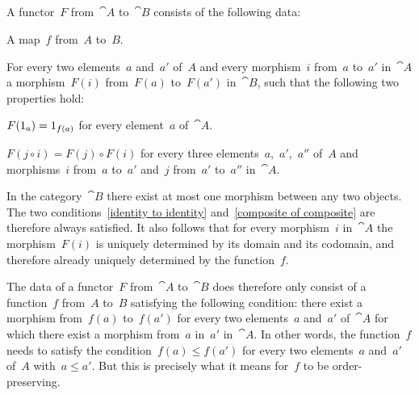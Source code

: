 \subsection{}

A functor~$F$ from~$\cat{A}$ to~$\cat{B}$ consists of the following data:
\begin{itemize*}
	\item
		A map~$f$ from~$A$ to~$B$.
	\item
		For every two elements~$a$ and~$a'$ of~$A$ and every morphism~$i$ from~$a$ to~$a'$ in~$\cat{A}$ a morphism~$F(i)$ from~$F(a)$ to~$F(a')$ in~$\cat{B}$, such that the following two properties hold:
		\begin{enumerate*}
			\item
				\label{identity to identity}
				$F(1_a) = 1_{f(a)}$ for every element~$a$ of~$\cat{A}$.
			\item
				\label{composite of composite}
				$F(j ∘ i) = F(j) ∘ F(i)$ for every three elements~$a$,~$a'$,~$a''$ of~$A$ and morphisms~$i$ from~$a$ to~$a'$ and~$j$ from~$a'$ to~$a''$ in~$\cat{A}$.
		\end{enumerate*}
\end{itemize*}

In the category~$\cat{B}$ there exist at most one morphism between any two objects.
The two conditions~\ref{identity to identity} and~\ref{composite of composite} are therefore always satisfied.
It also follows that for every morphism~$i$ in~$\cat{A}$ the morphism~$F(i)$ is uniquely determined by its domain and its codomain, and therefore already uniquely determined by the function~$f$.

The data of a functor~$F$ from~$\cat{A}$ to~$\cat{B}$ does therefore only consist of a function~$f$ from~$A$ to~$B$ satisfying the following condition:
there exist a morphism from~$f(a)$ to~$f(a')$ for every two elements~$a$ and~$a'$ of~$\cat{A}$ for which there exist a morphism from~$a$ in~$a'$ in~$\cat{A}$.
In other words, the function~$f$ needs to satisfy the condition~$f(a) ≤ f(a')$ for every two elements~$a$ and~$a'$ of~$A$ with~$a ≤ a'$.
But this is precisely what it means for~$f$ to be order-preserving.
